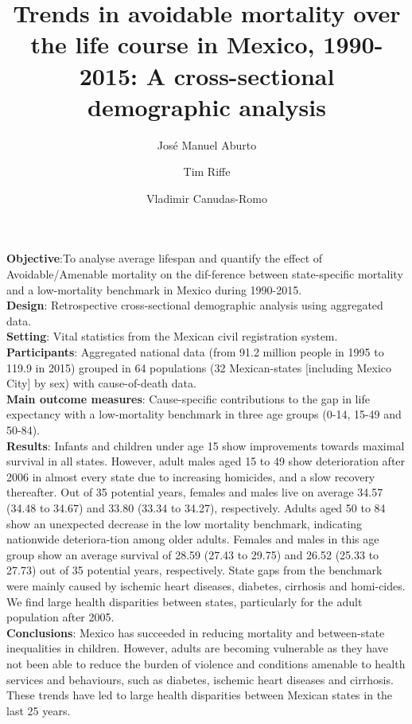 \documentclass[11.5pt]{article}
\title{Trends in avoidable mortality over the life course in Mexico, 1990-2015:  A cross-sectional demographic analysis}
\author[1]{Jos\'e Manuel Aburto}
\author[2]{Tim Riffe}
\author[3]{Vladimir Canudas-Romo}
\affil[1]{University of Southern Denmark}
\affil[2]{Max Planck Institute for Demographic Research}
\affil[3]{School of Demography, Australian National University}
\begin{document}
\newcommand{\vect}[1]{\boldsymbol{#1}}

\maketitle

\abstract
\textbf{Objective}:To analyse average lifespan and quantify the effect of Avoidable/Amenable mortality on the dif-ference between state-specific mortality and a low-mortality benchmark in Mexico during 1990-2015.\\

\textbf{Design}: Retrospective cross-sectional demographic analysis using aggregated data.\\

\textbf{Setting}: Vital statistics from the Mexican civil registration system.\\

\textbf{Participants}: Aggregated national data (from 91.2 million people in 1995 to 119.9 in 2015) grouped in 64 populations (32 Mexican-states [including Mexico City] by sex) with cause-of-death data.\\

\textbf{Main outcome measures}: Cause-specific contributions to the gap in life expectancy with a low-mortality benchmark in three age groups (0-14, 15-49 and 50-84).\\

\textbf{Results}: Infants and children under age 15 show improvements towards maximal survival in all states. However, adult males aged 15 to 49 show deterioration after 2006 in almost every state due to increasing homicides, and a slow recovery thereafter. Out of 35 potential years, females and males live on average 34.57 (34.48 to 34.67) and 33.80 (33.34 to 34.27), respectively. Adults aged 50 to 84 show an unexpected decrease in the low mortality benchmark, indicating nationwide deteriora-tion among older adults. Females and males in this age group show an average survival of 28.59 (27.43 to 29.75) and 26.52 (25.33 to 27.73) out of 35 potential years, respectively. State gaps from the benchmark were mainly caused by ischemic heart diseases, diabetes, cirrhosis and homi-cides. We find large health disparities between states, particularly for the adult population after 2005.\\

\textbf{Conclusions}: Mexico has succeeded in reducing mortality and between-state inequalities in children. However, adults are becoming vulnerable as they have not been able to reduce the burden of violence and conditions amenable to health services and behaviours, such as diabetes, ischemic heart diseases and cirrhosis. These trends have led to large health disparities between Mexican states in the last 25 years.
\end{document}
